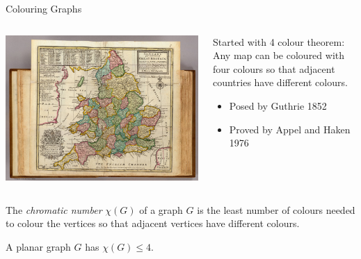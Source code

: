 \documentclass{beamer}
\begin{document}
\begin{frame}{Colouring Graphs}
\begin{columns}
\begin{column}{.5\textwidth}
\includegraphics[width=\textwidth]{Pictures/EnglishCounties.jpg}
\end{column}

\begin{column}{.5\textwidth}
\begin{block}{Started with 4 colour theorem:}
Any map can be coloured with four colours so that adjacent countries have different colours.
\begin{itemize}
\item Posed by Guthrie 1852
    \item Proved by Appel and Haken 1976
\end{itemize}    


\end{block}
\end{column}
\end{columns}
\begin{definition}The \emph{chromatic number} $\chi(G)$ of a graph $G$ is the least number of colours needed to colour the vertices so that adjacent vertices have different colours.
\end{definition}
\begin{theorem}
A planar graph $G$ has $\chi(G)\leq 4$.
\end{theorem}
\end{frame}
\end{document}
